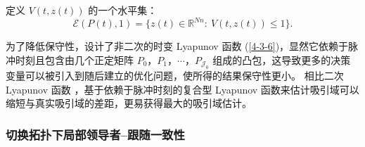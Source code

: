  
定义 $V(t,z(t))$ 的一个水平集： $$ \mathscr{E} ( P(t),1)=\{z(t)\in \mathbb{R}^{Nn}:\  V(t,z(t))\leq 1\}.$$

\begin{remark} 
为了降低保守性，设计了非二次的时变 Lyapunov 函数 (\ref{4-3-6})，显然它依赖于脉冲时刻且包含由几个正定矩阵 $P_0$，$P_1$，$\cdots$，$P_{\mathcal{J}_0}$ 组成的凸包，这导致更多的决策变量可以被引入到随后建立的优化问题，使所得的结果保守性更小。 相比二次 Lyapunov 函数  \cite{2013Analysis871,2014Global499,2017Global1270,2020Performance734,2013Adaptive1545,2018Event4391,2020Consensus194,2020Adaptive3013960}，基于依赖于脉冲时刻的复合型 Lyapunov 函数来估计吸引域可以缩短与真实吸引域的差距，更易获得最大的吸引域估计。
\end{remark}

\subsubsection{切换拓扑下局部领导者--跟随一致性} 
